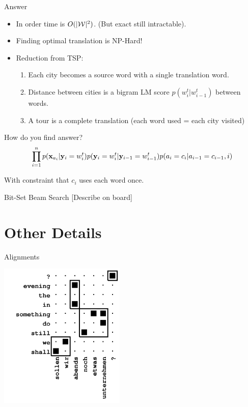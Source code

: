 \documentclass{beamer}
\begin{document}
\begin{frame}{Answer}
  \begin{itemize}
  \item In order time is $O(|\mathcal{W}|^2)$. (But exact still intractable).
    \air  

  \item Finding optimal translation is NP-Hard!
    \air 

  \item Reduction from TSP:
    \begin{enumerate}
    \item Each city becomes a source word with a single translation word.
    \item Distance between cities is a bigram LM score $p(w^t_i | w^t_{i-1})$ between words.
    \item A tour is a complete translation (each word used = each city visited)
    \end{enumerate}
  \end{itemize}
\end{frame}

\begin{frame}{How do you find answer?}
  \[  \prod_{i=1}^n p(\mathbf{x}_{a_i} | \mathbf{y}_i=w^t_i) p(\mathbf{y}_i=w^t_i | \mathbf{y}_{i-1}=w^t_{i-1}) p(a_i = c_i | a_{i-1}=c_{i-1}, i) \] 

  With constraint that $c_i$ uses each word once.  

\end{frame}

\begin{frame}{Bit-Set Beam Search}
  [Describe on board] 
\end{frame}


\section{Other Details}


\begin{frame}{Alignments}
  \begin{center}
    \includegraphics[width=6cm]{Alignment}
  \end{center}
\end{frame}
\end{document}
